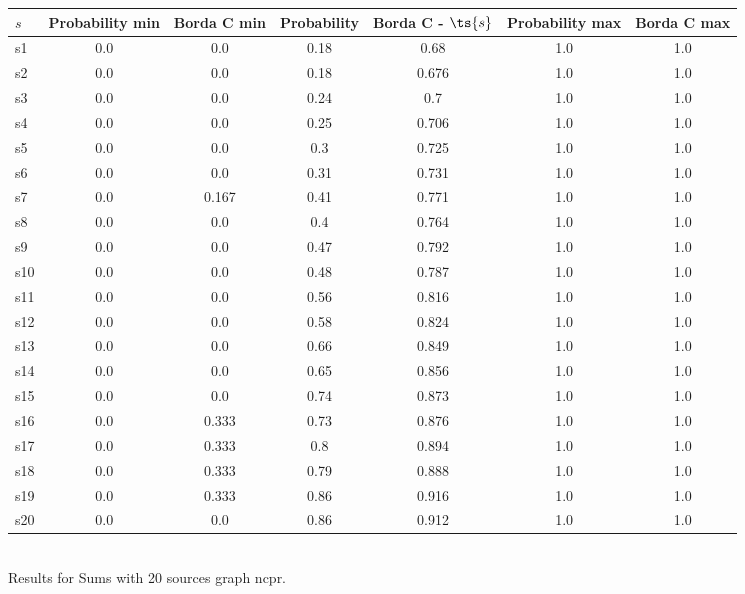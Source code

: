 \documentclass{article}
\begin{document}
\noindent\begin{tabular}{|l|c|c|c|c|c|c|}
\hline
$s$& Probability min & Borda C min & Probability & Borda C - $\ts{s}$ & Probability max & Borda C max\\
\hline
s1 &0.0 & 0.0 & 0.18 & 0.68 & 1.0 & 1.0\\
\hline
s2 &0.0 & 0.0 & 0.18 & 0.676 & 1.0 & 1.0\\
\hline
s3 &0.0 & 0.0 & 0.24 & 0.7 & 1.0 & 1.0\\
\hline
s4 &0.0 & 0.0 & 0.25 & 0.706 & 1.0 & 1.0\\
\hline
s5 &0.0 & 0.0 & 0.3 & 0.725 & 1.0 & 1.0\\
\hline
s6 &0.0 & 0.0 & 0.31 & 0.731 & 1.0 & 1.0\\
\hline
s7 &0.0 & 0.167 & 0.41 & 0.771 & 1.0 & 1.0\\
\hline
s8 &0.0 & 0.0 & 0.4 & 0.764 & 1.0 & 1.0\\
\hline
s9 &0.0 & 0.0 & 0.47 & 0.792 & 1.0 & 1.0\\
\hline
s10 &0.0 & 0.0 & 0.48 & 0.787 & 1.0 & 1.0\\
\hline
s11 &0.0 & 0.0 & 0.56 & 0.816 & 1.0 & 1.0\\
\hline
s12 &0.0 & 0.0 & 0.58 & 0.824 & 1.0 & 1.0\\
\hline
s13 &0.0 & 0.0 & 0.66 & 0.849 & 1.0 & 1.0\\
\hline
s14 &0.0 & 0.0 & 0.65 & 0.856 & 1.0 & 1.0\\
\hline
s15 &0.0 & 0.0 & 0.74 & 0.873 & 1.0 & 1.0\\
\hline
s16 &0.0 & 0.333 & 0.73 & 0.876 & 1.0 & 1.0\\
\hline
s17 &0.0 & 0.333 & 0.8 & 0.894 & 1.0 & 1.0\\
\hline
s18 &0.0 & 0.333 & 0.79 & 0.888 & 1.0 & 1.0\\
\hline
s19 &0.0 & 0.333 & 0.86 & 0.916 & 1.0 & 1.0\\
\hline
s20 &0.0 & 0.0 & 0.86 & 0.912 & 1.0 & 1.0\\
\hline
\end{tabular}\\

\noindent Results for Sums with 20 sources graph ncpr.
\end{document}
